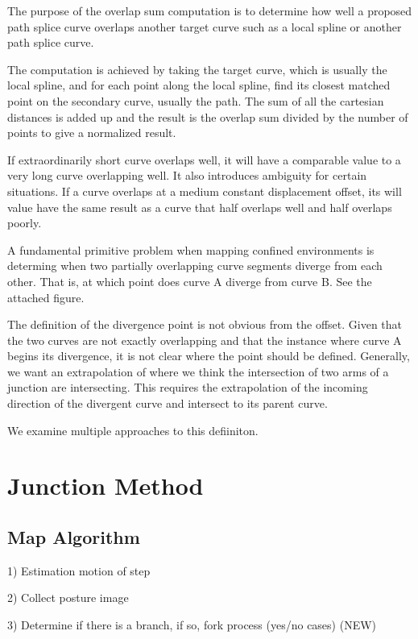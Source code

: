 The purpose of the overlap sum computation is to determine how well a proposed path splice curve overlaps another target curve such as a local spline or another path splice curve.

The computation is achieved by taking the target curve, which is usually the local spline, and for each point along the local spline, find its closest matched point on the secondary curve, usually the path. The sum of all the cartesian distances is added up and the result is the overlap sum divided by the number of points to give a normalized result.

If extraordinarily short curve overlaps well, it will have a comparable value to a very long curve overlapping well. It also introduces ambiguity for certain situations. If a curve overlaps at a medium constant displacement offset, its will value have the same result as a curve that half overlaps well and half overlaps poorly.

A fundamental primitive problem when mapping confined environments is determing when two partially overlapping curve segments diverge from each other. That is, at which point does curve A diverge from curve B. See the attached figure.

The definition of the divergence point is not obvious from the offset. Given that the two curves are not exactly overlapping and that the instance where curve A begins its divergence, it is not clear where the point should be defined. Generally, we want an extrapolation of where we think the intersection of two arms of a junction are intersecting. This requires the extrapolation of the incoming direction of the divergent curve and intersect to its parent curve.

We examine multiple approaches to this defiiniton.

\section{Junction Method}
\label{junctionmethod}

\subsection{Map Algorithm}
\label{mapalgorithm}

1) Estimation motion of step

2) Collect posture image

3) Determine if there is a branch, if so, fork process (yes\slash no cases) (NEW)

